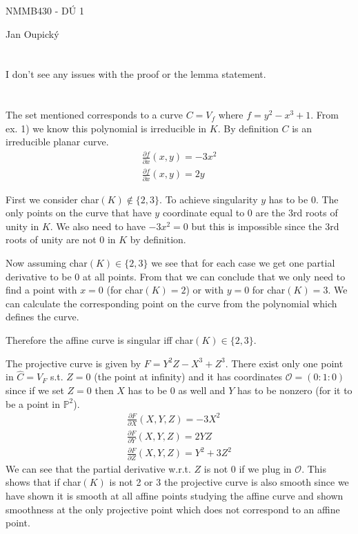 \documentclass[12pt, a4paper]{article}
\begin{document}
\begin{center}
\large NMMB430 - DÚ 1

\normalsize Jan Oupický
\end{center}
\vspace{1\baselineskip}

\section{}
I don't see any issues with the proof or the lemma statement.

\section{}
The set mentioned corresponds to a curve $C= V_f$ where $f=y^2-x^3+1$. From ex. 1) we know this polynomial is irreducible in $K$. By definition $C$ is an irreducible planar curve.
\begin{gather*}
\frac{\partial f}{\partial x} (x,y) = -3x^2\\
\frac{\partial f}{\partial x} (x,y) = 2y
\end{gather*}

First we consider char$(K) \notin \{2,3\}$. To achieve singularity $y$ has to be $0$. The only points on the curve that have $y$ coordinate equal to $0$ are the 3rd roots of unity in $K$. We also need to have $-3x^2 = 0$ but this is impossible since the 3rd roots of unity are not $0$ in $K$ by definition.

Now assuming char$(K) \in \{2,3\}$ we see that for each case we get one partial derivative to be 0 at all points. From that we can conclude that we only need to find a point with $x=0$ (for char$(K)=2$) or with $y=0$ for char$(K)=3$. We can calculate the corresponding point on the curve from the polynomial which defines the curve.

Therefore the affine curve is singular iff char$(K) \in \{2,3\}$.

The projective curve is given by $F= Y^2Z-X^3+Z^3$. There exist only one point in $\hat{C} = V_F$ s.t. $Z = 0$ (the point at infinity) and it has coordinates $\mathcal{O} = (0:1:0)$ since if we set $Z=0$ then $X$ has to be $0$ as well and $Y$ has to be nonzero (for it to be a point in $\mathbb{P}^2$).
\begin{gather*}
\frac{\partial F}{\partial X} (X,Y,Z) = -3X^2\\
\frac{\partial F}{\partial Y} (X,Y,Z) = 2YZ\\
\frac{\partial F}{\partial Z} (X,Y,Z) = Y^2+3Z^2
\end{gather*}
We can see that the partial derivative w.r.t. $Z$ is not $0$ if we plug in $\mathcal{O}$. This shows that if char$(K)$ is not 2 or 3 the projective curve is also smooth since we have shown it is smooth at all affine points studying the affine curve and shown smoothness at the only projective point which does not correspond to an affine point.
\end{document}
